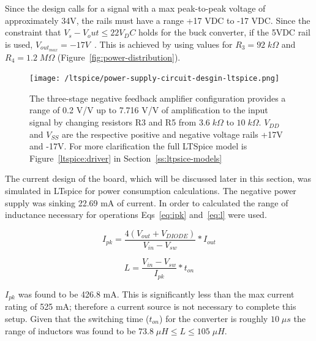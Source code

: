 \documentclass[12pt,journal]{IEEEtran}
\begin{document}
Since the design calls for a signal with a max peak-to-peak voltage of approximately 34V, the rails must have a range +17 VDC to -17 VDC. Since the constraint that $V_s - V_out \leq 22 V_DC$ holds for the buck converter, if the 5VDC rail is used, $V_{out_{max}} = -17 V$~\cite{datasheet_max635}. This is achieved by using values for $R_3 = 92\;k\Omega$ and $R_4 = 1.2\;M\Omega$ (Figure~\ref{fig:power-distribution}). 

\begin{figure}[tb]
  \centering
	\texttt{[image: /ltspice/power-supply-circuit-desgin-ltspice.png]}
	\caption[Cavity Mounts]{The three-stage negative feedback amplifier configuration provides a range of 0.2 V/V up to 7.716 V/V of amplification to the input signal by changing resistors R3 and R5 from $3.6\;k\Omega$ to $10\;k\Omega$. $V_{DD}$ and $V_{SS}$ are the respective positive and negative voltage rails +17V and -17V. For more clarification the full LTSpice model is Figure~\ref{ltspice:driver} in Section~\ref{ss:ltpsice-models}}
	\label{fig:amplifier-configuration}
\end{figure}

The current design of the board, which will be discussed later in this section, was simulated in LTspice for power consumption calculations. The negative power supply was sinking 22.69 mA of current. In order to calculated the range of inductance necessary for operations Eqs~\ref{eq:ipk} and~\ref{eq:l} were used. 

\begin{equation}
I_{pk} = \frac{4(V_{out} + V_{DIODE})}{V_{in} - V_{sw}}*I_{out}
\label{eq:ipk}
\end{equation}

\begin{equation}
L = \frac{V_{in} - V_{sw}}{I_{pk}}*t_{on}
\label{eq:l}
\end{equation}

$I_{pk}$ was found to be 426.8 mA. This is significantly less than the max current rating of 525 mA; therefore a current source is not necessary to complete this setup. Given that the switching time ($t_{on}$) for the converter is roughly $10\;\mu s$ the range of inductors was found to be $73.8\; \mu H \leq L \leq 105\; \mu H$.  
\end{document}
